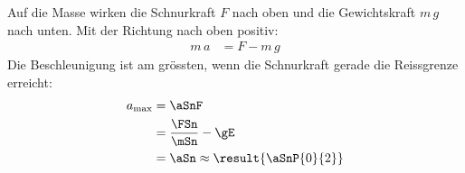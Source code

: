 Auf die Masse wirken die Schnurkraft $F$ nach oben und die Gewichtskraft $m\,g$ nach unten. Mit der Richtung nach oben positiv:
\begin{align}
 m\,a &= F - m\,g
\end{align}
Die Beschleunigung ist am grössten, wenn die Schnurkraft gerade die Reissgrenze erreicht:
\begin{align}
 a_\text{max} &= \aSnF \\
   &= \frac{\FSn}{\mSn}-\gE \\
   &= \aSn \approx \result{\aSnP{0}{2}}
\end{align}
